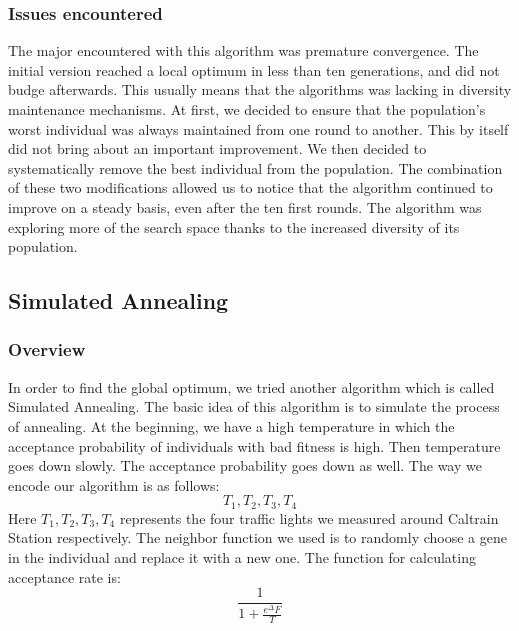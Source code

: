 \documentclass{article} %
\begin{document}
\subsubsection{Issues encountered}
The major encountered with this algorithm was premature convergence. The initial version reached a local optimum in less than ten generations, and did not budge afterwards. This usually means that the algorithms was lacking in diversity maintenance mechanisms. At first, we decided to ensure that the population's worst individual was always maintained from one round to another. This by itself did not bring about an important improvement. 
We then decided to systematically remove the best individual from the population. The combination of these two modifications allowed us to notice that the algorithm continued to improve on a steady basis, even after the ten first rounds. The algorithm was exploring more of the search space thanks to the increased diversity of its population.


\subsection{Simulated Annealing}
\subsubsection{Overview}
In order to find the global optimum, we tried another algorithm which is called Simulated Annealing. The basic idea of this algorithm is to simulate the process of annealing. At the beginning, we have a high temperature in which the acceptance probability of individuals with bad fitness is high. Then temperature goes down slowly. The acceptance probability goes down as well. The way we encode our algorithm is as follows:
\begin{equation}
T_1, T_2, T_3, T_4
\end{equation}
Here $T_1, T_2, T_3, T_4$ represents the four traffic lights we measured around Caltrain Station respectively.
The neighbor function we used is to randomly choose a gene in the individual and replace it with a new one.
The function for calculating acceptance rate is:
\begin{equation}
\frac{1}{1 + \frac{e^{\Delta} F}{T}}
\end{equation}
\end{document}
